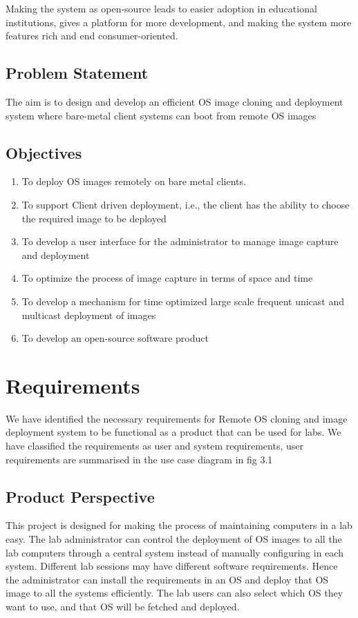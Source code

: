 \documentclass[a4paper,12pt]{article}
\begin{document}
 Making the system as open-source leads to easier adoption in educational institutions, gives a platform for more development, and making the system more features rich and end consumer-oriented. 

\subsection{Problem Statement}
The aim is to design and develop an efficient OS image cloning and deployment system where bare-metal client systems can boot from remote OS images

\subsection{Objectives}
\begin{enumerate}
\item To deploy OS images remotely on bare metal clients.
\item To support Client driven deployment, i.e., the client has the ability to choose the required image to be deployed
\item To develop a user interface for the administrator to manage image capture and deployment
\item To optimize the process of image capture in terms of space and time
\item To develop a mechanism for time optimized large scale frequent unicast and multicast  deployment of images 
\item To develop an open-source software product
\end{enumerate}


\newpage
\section{\fontsize{16pt}{1em} Requirements}
We have identified the necessary requirements for Remote OS cloning and image deployment system to be functional as a product that can be used for labs. We have classified the requirements as user and system requirements, user requirements are summarised in the use case diagram in fig 3.1
\subsection{Product Perspective}
This project is designed for making the process of maintaining computers in a lab easy. The lab administrator can control the deployment of OS images to all the lab computers through a central system instead of manually configuring in each system. Different lab sessions may have different software requirements. Hence the administrator can install the requirements in an OS and deploy that OS image to all the systems efficiently. The lab users can also select which OS they want to use, and that OS will be fetched and deployed.
\end{document}
